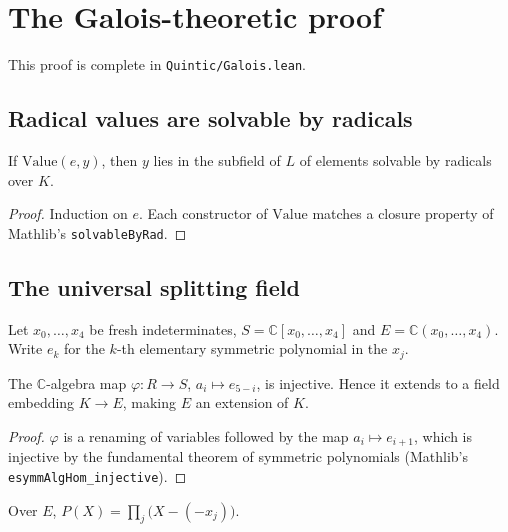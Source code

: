 \chapter{The Galois-theoretic proof}
\label{chap:galois}

This proof is complete in \texttt{Quintic/Galois.lean}.

\section{Radical values are solvable by radicals}

\begin{lemma}
  \label{lem:value-solvable-by-rad}
  \leanok
  If $\mathrm{Value}(e, y)$, then $y$ lies in the subfield of $L$ of elements
  solvable by radicals over $K$.
\end{lemma}

\begin{proof}
  \leanok
  Induction on $e$. Each constructor of $\mathrm{Value}$ matches a closure property
  of Mathlib's \texttt{solvableByRad}.
\end{proof}

\section{The universal splitting field}

Let $x_0, \dots, x_4$ be fresh indeterminates, $S = \mathbb{C}[x_0, \dots, x_4]$ and
$E = \mathbb{C}(x_0, \dots, x_4)$. Write $e_k$ for the $k$-th elementary symmetric polynomial
in the $x_j$.

\begin{lemma}
  \label{lem:phi-injective}
  \leanok
  The $\mathbb{C}$-algebra map $\varphi : R \to S$, $a_i \mapsto e_{5-i}$, is injective.
  Hence it extends to a field embedding $K \to E$, making $E$ an extension of $K$.
\end{lemma}

\begin{proof}
  \leanok
  $\varphi$ is a renaming of variables followed by the map $a_i \mapsto e_{i+1}$,
  which is injective by the fundamental theorem of symmetric polynomials
  (Mathlib's \texttt{esymmAlgHom\_injective}).
\end{proof}

\begin{lemma}
  \label{lem:map-generic-quintic}
  \leanok
  Over $E$, $P(X) = \prod_{j} \bigl(X - (-x_j)\bigr)$.
\end{lemma}

